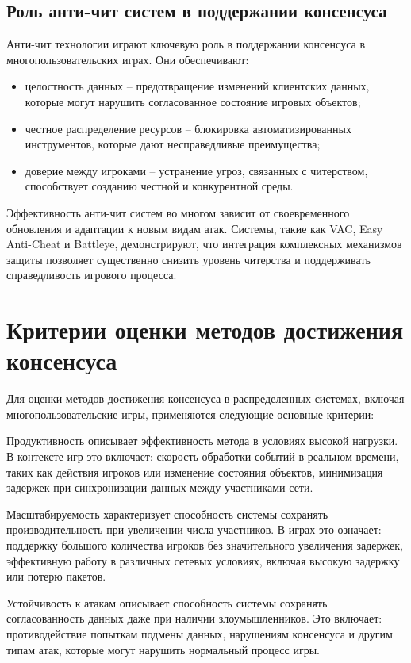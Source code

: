 \section{Роль анти-чит систем в поддержании консенсуса}
Анти-чит технологии играют ключевую роль в поддержании консенсуса в многопользовательских играх. Они обеспечивают:
\begin{itemize}
	\item целостность данных -- предотвращение изменений клиентских данных, которые могут нарушить согласованное состояние игровых объектов;
	\item честное распределение ресурсов -- блокировка автоматизированных инструментов, которые дают несправедливые преимущества;
	\item доверие между игроками -- устранение угроз, связанных с читерством, способствует созданию честной и конкурентной среды.
\end{itemize}

Эффективность анти-чит систем во многом зависит от своевременного обновления и адаптации к новым видам атак. Системы, такие как VAC, Easy Anti-Cheat и Battleye, демонстрируют, что интеграция комплексных механизмов защиты позволяет существенно снизить уровень читерства и поддерживать справедливость игрового процесса.

\chapter{Критерии оценки методов достижения консенсуса}

Для оценки методов достижения консенсуса в распределенных системах, включая многопользовательские игры, применяются следующие основные критерии:

Продуктивность описывает эффективность метода в условиях высокой нагрузки. В контексте игр это включает: скорость обработки событий в реальном времени, таких как действия игроков или изменение состояния объектов, минимизация задержек при синхронизации данных между участниками сети.

Масштабируемость характеризует способность системы сохранять производительность при увеличении числа участников. В играх это означает: поддержку большого количества игроков без значительного увеличения задержек, эффективную работу в различных сетевых условиях, включая высокую задержку или потерю пакетов.

Устойчивость к атакам описывает способность системы сохранять согласованность данных даже при наличии злоумышленников. Это включает: противодействие попыткам подмены данных, нарушениям консенсуса и другим типам атак, которые могут нарушить нормальный процесс игры.

